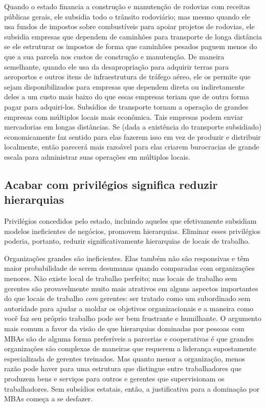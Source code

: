 Quando o estado financia a construção e manutenção de rodovias com receitas públicas gerais, ele subsidia todo o trânsito rodoviário; mas mesmo quando ele usa fundos de impostos sobre combustíveis para apoiar projetos de rodovias, ele subsidia empresas que dependem de caminhões para transporte de longa distância se ele estruturar os impostos de forma que caminhões pesados paguem menos do que a sua parcela nos custos de construção e manutenção. De maneira semelhante, quando ele usa da desapropriação para adquirir terras para aeroportos e outros itens de infraestrutura de tráfego aéreo, ele os permite que sejam disponibilizados para empresas que dependem direta ou indiretamente deles a um custo mais baixo do que essas empresas teriam que de outra forma pagar para adquiri-los. Subsídios de transporte tornam a operação de grandes empresas com múltiplos locais mais econômica. Tais empresas podem enviar mercadorias em longas distâncias. Se (dada a existência do transporte subsidiado) economicamente faz sentido para elas fazerem isso em vez de produzir e distribuir localmente, então parecerá mais razoável para elas criarem burocracias de grande escala para administrar suas operações em múltiplos locais.

\subsection*{Acabar com privilégios significa reduzir hierarquias}

Privilégios concedidos pelo estado, incluindo aqueles que efetivamente subsidiam modelos ineficientes de negócios, promovem hierarquias. Eliminar esses privilégios poderia, portanto, reduzir significativamente hierarquias de locais de trabalho.

Organizações grandes são ineficientes. Elas também não são responsivas e têm maior probabilidade de serem desumanas quando comparadas com organizações menores. Não existe local de trabalho perfeito; mas locais de trabalho sem gerentes são provavelmente muito mais atrativos em alguns aspectos importantes do que locais de trabalho \emph{com} gerentes: ser tratado como um subordinado sem autoridade para ajudar a moldar os objetivos organizacionais e a maneira como você faz seu próprio trabalho pode ser bem frustrante e humilhante. O argumento mais comum a favor da visão de que hierarquias dominadas por pessoas com MBAs são de alguma forma preferíveis a parcerias e cooperativas é que grandes organizações são complexas de maneiras que requerem a liderança supostamente especializada de gerentes treinados. Mas quanto menor a organização, menos razão pode haver para uma estrutura que distingue entre trabalhadores que produzem bens e serviços para outros e gerentes que supervisionam os trabalhadores. Sem subsídios estatais, então, a justificativa para a dominação por MBAs começa a se desfazer.


